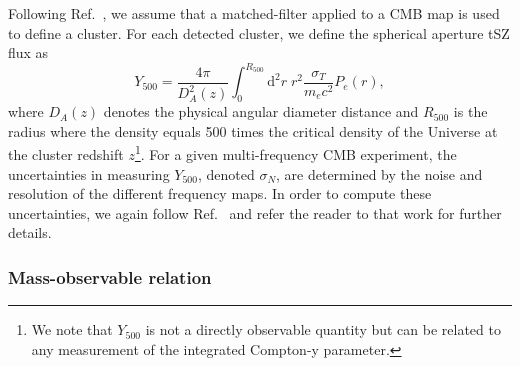 \documentclass[%
 reprint,
nofootinbib,
 amsmath,amssymb,
 aps,
]{revtex4-1}
\begin{document}
Following Ref.~\cite{Madhavacheril:2017}, we assume that  a matched-filter applied to a CMB map is used to define a cluster. For each detected cluster, we define the spherical aperture tSZ flux as \cite{Alonso:2016}
\begin{equation}
Y_{500} = \frac{4 \pi}{D_{A}^{2}(z)} \int_{0}^{R_{500}} \mathrm{d}^{2}r\; r^{2} \frac{\sigma_{T}}{m_{e}c^{2}} P_{e}(r),
\end{equation} 
where $D_{A}(z)$ denotes the physical angular diameter distance and $R_{500}$ is the radius where the density equals 500 times the critical density of the Universe at the cluster redshift $z$\footnote{We note that $Y_{500}$ is not a directly observable quantity but can be related to any measurement of the integrated Compton-y parameter.}. For a given multi-frequency CMB experiment, the uncertainties in measuring $Y_{500}$, denoted $\sigma_{N}$, are determined by the noise and resolution of the different frequency maps. In order to compute these uncertainties, we again follow Ref.~\cite{Madhavacheril:2017} and refer the reader to that work for further details.

\subsubsection{Mass-observable relation}\label{subsubsec:obs.tSZ.ym}
\end{document}
